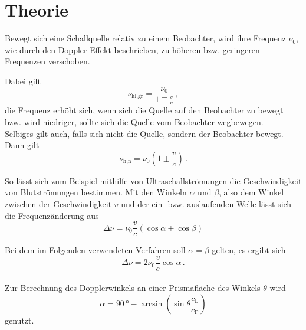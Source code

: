 \section{Theorie}
\label{sec:theorie}

Bewegt sich eine Schallquelle relativ zu einem
Beobachter, wird ihre Frequenz $\nu_0$, wie durch den
Doppler-Effekt beschrieben, zu höheren bzw.
geringeren Frequenzen verschoben.

Dabei gilt
\begin{equation}
    \nu_{\text{kl},\text{gr}} = \frac{\nu_0}
    {1 \mp \frac{v}{c}} \,,
    \label{eq:doppler1}
\end{equation}
die Frequenz erhöht sich, wenn sich die 
Quelle auf den Beobachter zu bewegt bzw.
wird niedriger, sollte sich die Quelle vom
Beobachter wegbewegen. \\

Selbiges gilt auch, falls sich nicht die Quelle, 
sondern der Beobachter bewegt.
Dann gilt
\begin{equation}
    \nu_{\text{h},\text{n}} = \nu_0 \left(1 \pm \frac{v}{c} \right) \,.
    \label{eq:doppler2}
\end{equation}

So lässt sich zum Beispiel mithilfe von Ultraschallströmungen
die Geschwindigkeit von Blutströmungen bestimmen.
Mit den Winkeln $\alpha$ und $\beta$, also dem Winkel zwischen der
Geschwindigkeit $v$ und der ein- bzw. auslaufenden Welle lässt sich
die Frequenzänderung aus
\begin{equation*}
    \Delta \nu = \nu_0 \frac{v}{c} (\cos \alpha + \cos \beta)
\end{equation*}

Bei dem im Folgenden verwendeten Verfahren soll 
$\alpha = \beta$ gelten, es ergibt sich
\begin{equation}
    \Delta \nu = 2 \nu_0 \frac{v}{c} \cos \alpha \,.
    \label{eq:dopplerversch}
\end{equation} \\

Zur Berechnung des Dopplerwinkels an einer Prismafläche 
des Winkels $\theta$ wird 
\begin{equation}
    \alpha = 90 \,° - \arcsin \left(\sin\theta \frac{c_\text{L}}{c_\text{P}} \right)
\end{equation}
genutzt.